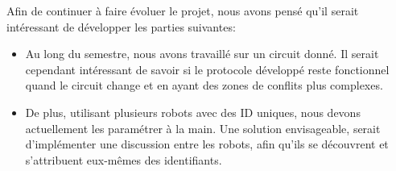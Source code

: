 \documentclass[french,a4paper,12pt]{report}
\begin{document}
Afin de continuer à faire évoluer le projet, nous avons pensé qu'il serait intéressant de développer les parties suivantes:
\begin{itemize}
\item Au long du semestre, nous avons travaillé sur un circuit donné. Il serait cependant intéressant de savoir si le protocole développé reste fonctionnel quand le circuit change et en ayant des zones de conflits plus complexes.

\item De plus, utilisant plusieurs robots avec des ID uniques, nous devons actuellement les paramétrer à la main. Une solution envisageable, serait d'implémenter une discussion entre les robots, afin qu'ils se découvrent et s'attribuent eux-mêmes des identifiants.
\end{itemize}
\end{document}
